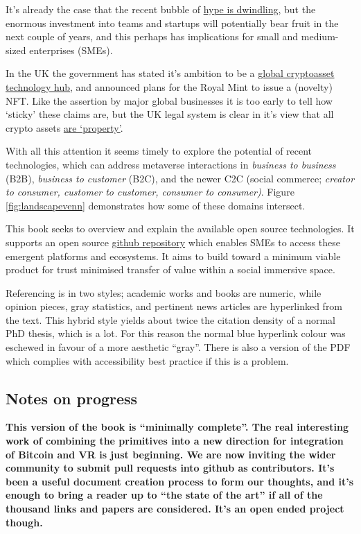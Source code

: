 \documentclass[
	12pt, %
	fleqn, %
	a4paper, %
	oneside, %
]{LegrandOrangeBook}
\begin{document}
It's already the case that the recent bubble of \href{https://www.forbes.com/sites/paultassi/2022/03/10/interest-in-nfts-and-the-metaverse-is-falling-fast/?}{hype is dwindling}, but the enormous investment into teams and startups will potentially bear fruit in the next couple of years, and this perhaps has implications for small and medium-sized enterprises (SMEs). \par
In the UK the government has stated it's ambition to be a \href{https://www.gov.uk/government/news/government-sets-out-plan-to-make-uk-a-global-cryptoasset-technology-hub}{global cryptoasset technology hub}, and announced plans for the Royal Mint to issue a (novelty) NFT. Like the assertion by major global businesses it is too early to tell how `sticky' these claims are, but the UK legal system is clear in it's view that all crypto assets \href{https://blockchain.bakermckenzie.com/2020/02/03/uk-court-confirms-bitcoins-status-as-property/}{are `property'}.\par
With all this attention it seems timely to explore the potential of recent technologies, which can address metaverse interactions in \textit{business to business} (B2B), \textit{business to customer} (B2C), and the newer C2C (social commerce; \textit{creator to consumer, customer to customer, consumer to consumer\cite{jones2008trust})}. Figure \ref{fig:landscapevenn} demonstrates how some of these domains intersect.\par
This book seeks to overview and explain the available open source technologies. It supports an open source \href{https://github.com/flossverse/origin}{github repository} which enables SMEs to access these emergent platforms and ecosystems. It aims to build toward a minimum viable product for trust minimised transfer of value within a social immersive space.\par
Referencing is in two styles; academic works and books are numeric, while opinion pieces, gray statistics, and pertinent news articles are hyperlinked from the text. This hybrid style yields about twice the citation density of a normal PhD thesis, which is a lot. For this reason the normal blue hyperlink colour was eschewed in favour of a more aesthetic ``gray''. There is also a version of the PDF which complies with accessibility best practice if this is a problem.  \par 
\subsection{Notes on progress}
\textbf{This version of the book is ``minimally complete''. The real interesting work of combining the primitives into a new direction for integration of Bitcoin and VR is just beginning. We are now inviting the wider community to submit pull requests into github as contributors. It's been a useful document creation process to form our thoughts, and it's enough to bring a reader up to ``the state of the art'' if all of the thousand  links and papers are considered. It's an open ended project though.}\
\end{document}
